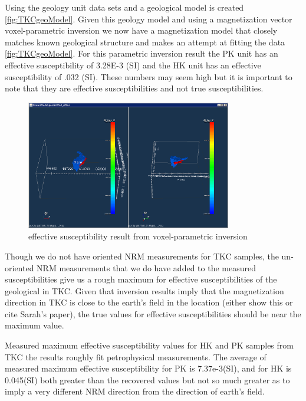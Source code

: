Using the geology unit data sets and a geological model is created \autoref{fig:TKCgeoModel}. Given this geology model and using a magnetization vector voxel-parametric inversion we now have a magnetization model that closely matches known geological structure and makes an attempt at fitting the data \autoref{fig:TKCgeoModel}. For this parametric inversion result the PK unit has an effective susceptibility of 3.28E-3 (SI) and the HK unit has an effective susceptibility of .032 (SI). These numbers may seem high but it is important to note that they are effective susceptibilities and not true susceptibilities. 

\begin{figure} [h]
   \centering
   \includegraphics[width=0.8\textwidth]{images/TKC/TKCsuscModel.PNG}
   \caption{effective susceptibility result from voxel-parametric inversion}
   \label{fig:TKCsuscModel}
\end{figure}

Though we do not have oriented \ac{NRM} measurements for TKC samples, the un-oriented \ac{NRM} measurements that we do have added to the measured susceptibilities give us a rough maximum for effective susceptibilities of the  geological in TKC. Given that inversion results imply that the magnetization direction in TKC is close to the earth's field in the location (either show this or cite Sarah's paper), the true  values for effective susceptibilities should be near the maximum value.

Measured maximum effective susceptibility values for HK and PK samples from TKC the results roughly fit petrophysical measurements. The average of measured maximum effective susceptibility for PK is 7.37e-3(SI), and for HK is 0.045(SI) both greater than the recovered values but not so much greater as to imply a very different \ac{NRM} direction from the direction of earth's field.


